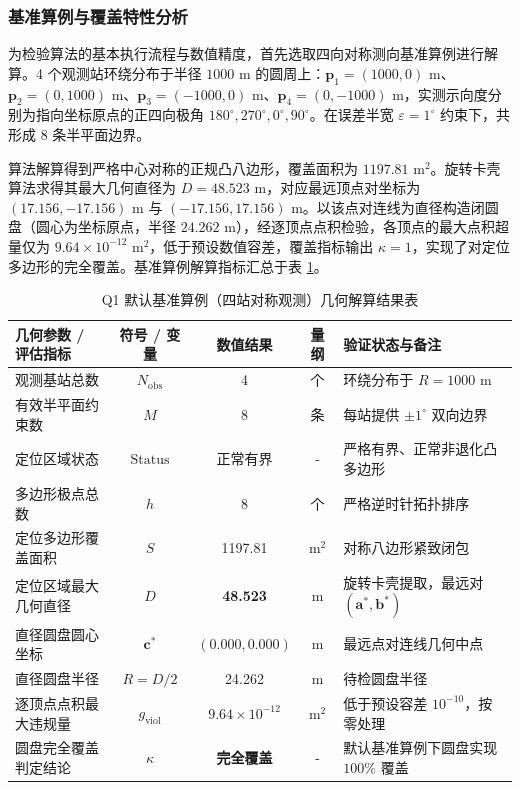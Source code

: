 \documentclass[zihao=-4,a4paper,UTF8]{ctexart}
\begin{document}
\subsubsection{基准算例与覆盖特性分析}

为检验算法的基本执行流程与数值精度，首先选取四向对称测向基准算例进行解算。4 个观测站环绕分布于半径 $1000\text{ m}$ 的圆周上：$\mathbf{p}_1=(1000, 0)\text{ m}$、$\mathbf{p}_2=(0, 1000)\text{ m}$、$\mathbf{p}_3=(-1000, 0)\text{ m}$、$\mathbf{p}_4=(0, -1000)\text{ m}$，实测示向度分别为指向坐标原点的正四向极角 $180^\circ, 270^\circ, 0^\circ, 90^\circ$。在误差半宽 $\varepsilon = 1^\circ$ 约束下，共形成 8 条半平面边界。

算法解算得到严格中心对称的正规凸八边形，覆盖面积为 $1197.81\text{ m}^2$。旋转卡壳算法求得其最大几何直径为 $D = 48.523\text{ m}$，对应最远顶点对坐标为 $(17.156, -17.156)\text{ m}$ 与 $(-17.156, 17.156)\text{ m}$。以该点对连线为直径构造闭圆盘（圆心为坐标原点，半径 $24.262\text{ m}$），经逐顶点点积检验，各顶点的最大点积超量仅为 $9.64 \times 10^{-12}\text{ m}^2$，低于预设数值容差，覆盖指标输出 $\kappa = 1$，实现了对定位多边形的完全覆盖。基准算例解算指标汇总于表 \ref{tab:q1_default_results}。

\begin{table}[htbp]
    \centering
    \small
    \caption{Q1 默认基准算例（四站对称观测）几何解算结果表}
    \label{tab:q1_default_results}
    \renewcommand{\arraystretch}{1.08}
    \begin{tabularx}{\linewidth}{X c c c X}
        \toprule[1.5pt]
        \textbf{几何参数 / 评估指标} & \textbf{符号 / 变量} & \textbf{数值结果} & \textbf{量纲} & \textbf{验证状态与备注} \\
        \midrule
        观测基站总数 & $N_{\text{obs}}$ & 4 & 个 & 环绕分布于 $R=1000\text{ m}$ \\
        有效半平面约束数 & $M$ & 8 & 条 & 每站提供 $\pm 1^\circ$ 双向边界 \\
        定位区域状态 & $\text{Status}$ & 正常有界 & - & 严格有界、正常非退化凸多边形 \\
        多边形极点总数 & $h$ & 8 & 个 & 严格逆时针拓扑排序 \\
        定位多边形覆盖面积 & $S$ & 1197.81 & $\text{m}^2$ & 对称八边形紧致闭包 \\
        定位区域最大几何直径 & $D$ & \textbf{48.523} & $\text{m}$ & 旋转卡壳提取，最远对 $(\mathbf{a}^*, \mathbf{b}^*)$ \\
        直径圆盘圆心坐标 & $\mathbf{c}^*$ & $(0.000, 0.000)$ & $\text{m}$ & 最远点对连线几何中点 \\
        直径圆盘半径 & $R = D/2$ & 24.262 & $\text{m}$ & 待检圆盘半径 \\
        逐顶点点积最大违规量 & $g_{\text{viol}}$ & $9.64 \times 10^{-12}$ & $\text{m}^2$ & 低于预设容差 $10^{-10}$，按零处理 \\
        圆盘完全覆盖判定结论 & $\kappa$ & \textbf{完全覆盖} & - & 默认基准算例下圆盘实现 $100\%$ 覆盖 \\
        \bottomrule[1.5pt]
    \end{tabularx}
\end{table}
\end{document}
